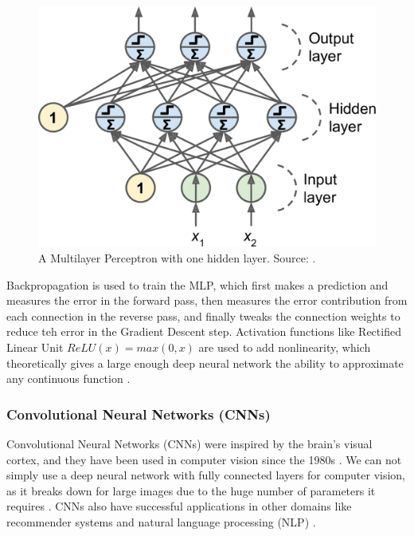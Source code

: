 \documentclass[a4paper, 11pt, oneside]{article}
\begin{document}
  \begin{figure}[ht]
    \begin{center}
      \includegraphics[width=.8\textwidth]{mlp.png}
    \end{center}
    \caption{A Multilayer Perceptron with one hidden layer. Source: \cite{geron2019hands}.}
  \end{figure}

  Backpropagation \cite{rumelhart1985learning} is used to train the MLP, which first makes a prediction and measures the
  error in the forward pass, then measures the error contribution from each connection in the reverse pass, and finally
  tweaks the connection weights to reduce teh error in the Gradient Descent \cite{ruder2016overview} step. Activation
  functions like Rectified Linear Unit $ReLU(x) = max(0, x)$ are used to add nonlinearity, which theoretically gives a
  large enough deep neural network the ability to approximate any continuous function \cite{geron2019hands}.

  \subsubsection{Convolutional Neural Networks (CNNs)}

  \label{sec:cnn}

  Convolutional Neural Networks (CNNs) were inspired by the brain's visual cortex, and they have been used in computer
  vision since the 1980s \cite{geron2019hands}. We can not simply use a deep neural network with fully connected layers
  for computer vision, as it breaks down for large images due to the huge number of parameters it requires
  \cite{geron2019hands}. CNNs also have successful applications in other domains like recommender systems
  \cite{van2013deep} and natural language processing (NLP) \cite{collobert2008unified}.
\end{document}
